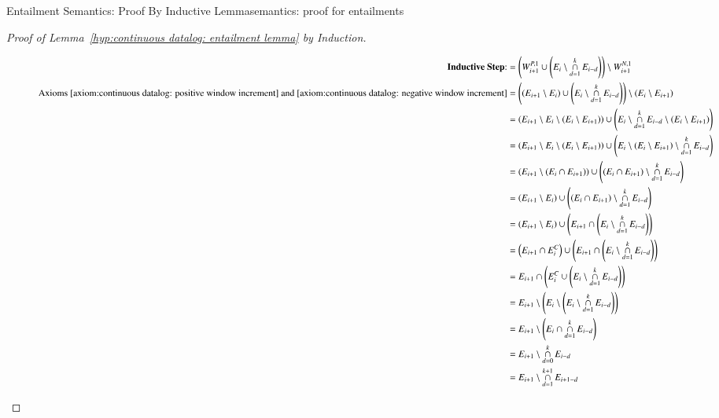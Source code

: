 \begin{nestedsection}{Entailment Semantics: Proof By Inductive Lemma}{semantics: proof for entailments}
\begin{proof}[Proof of Lemma~\ref{hyp:continuous datalog: entailment lemma} by Induction]
\begin{figure}[p]
\begin{align*}
				\text{\textbf{Inductive Step}:}& = \left( W^{P,1}_{i+1} \cup \left( E_{i} \setminus \mathop{\cap}^{k}_{d=1} E_{i-d} \right) \right) \setminus W^{N,1}_{i+1} \\
				\text{Axioms~\ref{axiom:continuous datalog: positive window increment}~and~\ref{axiom:continuous datalog: negative window increment}} & = \left( \left( E_{i+1} \setminus E_{i} \right) \cup \left( E_{i} \setminus \mathop{\cap}^{k}_{d=1} E_{i-d} \right) \right) \setminus \left( E_{i} \setminus E_{i+1} \right) \\
				& = \left( E_{i+1} \setminus E_{i} \setminus \left( E_{i} \setminus E_{i+1} \right) \right) \cup \left( E_{i} \setminus \mathop{\cap}^{k}_{d=1} E_{i-d} \setminus \left( E_{i} \setminus E_{i+1} \right) \right) \\
				& = \left( E_{i+1} \setminus E_{i} \setminus \left( E_{i} \setminus E_{i+1} \right) \right) \cup \left( E_{i} \setminus \left( E_{i} \setminus E_{i+1} \right) \setminus \mathop{\cap}^{k}_{d=1} E_{i-d} \right) \\
				& = \left( E_{i+1} \setminus \left( E_{i} \cap E_{i+1} \right) \right) \cup \left( \left( E_{i} \cap E_{i+1} \right) \setminus \mathop{\cap}^{k}_{d=1} E_{i-d} \right) \\
				& = \left( E_{i+1} \setminus E_{i} \right) \cup \left( \left( E_{i} \cap E_{i+1} \right) \setminus \mathop{\cap}^{k}_{d=1} E_{i-d} \right) \\
				& = \left( E_{i+1} \setminus E_{i} \right) \cup \left( E_{i+1} \cap \left( E_{i} \setminus \mathop{\cap}^{k}_{d=1} E_{i-d} \right) \right) \\
				& = \left( E_{i+1} \cap E^C_{i} \right) \cup \left( E_{i+1} \cap \left( E_{i} \setminus \mathop{\cap}^{k}_{d=1} E_{i-d} \right) \right)\\
				& = E_{i+1} \cap \left( E^C_{i} \cup \left( E_{i} \setminus \mathop{\cap}^{k}_{d=1} E_{i-d} \right) \right) \\
				& = E_{i+1} \setminus \left( E_{i} \setminus \left( E_{i} \setminus \mathop{\cap}^{k}_{d=1} E_{i-d} \right) \right) \\
				& = E_{i+1} \setminus \left( E_{i} \cap \mathop{\cap}^{k}_{d=1} E_{i-d} \right) \\
				& = E_{i+1} \setminus \mathop{\cap}^{k}_{d=0} E_{i-d} \\
				& = E_{i+1} \setminus \mathop{\cap}^{k+1}_{d=1} E_{i+1-d} \qedhere
			\end{align*}
		\end{figure}
	\end{proof}
\end{nestedsection}
